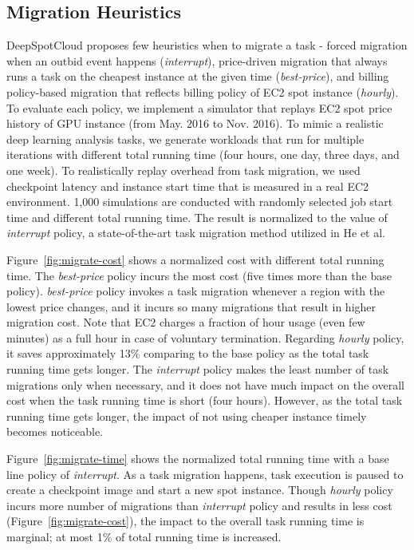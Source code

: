 \documentclass[conference]{IEEEtran}
\begin{document}
\subsection{Migration Heuristics}
DeepSpotCloud proposes few heuristics when to migrate a task - forced migration when an outbid event happens (\textit{interrupt}), price-driven migration that always runs a task on the cheapest instance at the given time (\textit{best-price}), and billing policy-based migration that reflects billing policy of EC2 spot instance (\textit{hourly}). To evaluate each policy, we implement a simulator that replays EC2 spot price history of GPU instance (from May. 2016 to Nov. 2016). To mimic a realistic deep learning analysis tasks, we generate workloads that run for multiple iterations with different total running time (four hours, one day, three days, and one week). To realistically replay overhead from task migration, we used checkpoint latency and instance start time that is measured in a real EC2 environment. 1,000 simulations are conducted with randomly selected job start time and different total running time. The result is normalized to the value of \textit{interrupt} policy, a state-of-the-art task migration method utilized in He et al.~\cite{spot-server-migrate}

Figure~\ref{fig:migrate-cost} shows a normalized cost with different total running time. The \textit{best-price} policy incurs the most cost (five times more than the base policy). \textit{best-price} policy invokes a task migration whenever a region with the lowest price changes, and it incurs so many migrations that result in higher migration cost. Note that EC2 charges a fraction of hour usage (even few minutes) as a full hour in case of voluntary termination. Regarding \textit{hourly} policy, it saves approximately 13\% comparing to the base policy as the total task running time gets longer. The \textit{interrupt} policy makes the least number of task migrations only when necessary, and it does not have much impact on the overall cost when the task running time is short (four hours). However, as the total task running time gets longer, the impact of not using cheaper instance timely becomes noticeable.

Figure~\ref{fig:migrate-time} shows the normalized total running time with a base line policy of \textit{interrupt}. As a task migration happens, task execution is paused to create a checkpoint image and start a new spot instance. Though \textit{hourly} policy incurs more number of migrations than \textit{interrupt} policy and results in less cost (Figure~\ref{fig:migrate-cost}), the impact to the overall task running time is marginal; at most 1\% of total running time is increased.
\end{document}
